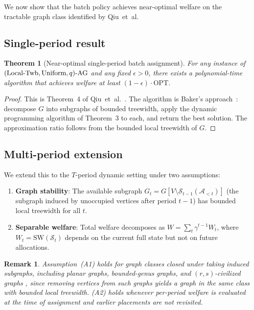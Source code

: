 \documentclass[11pt]{article}
\newtheorem{theorem}{Theorem}
\newtheorem{remark}{Remark}
\newcommand{\SW}{\mathrm{SW}}
\newcommand{\OPT}{\mathrm{OPT}}
\newcommand{\A}{\mathcal{A}}
\begin{document}
We now show that the batch policy achieves near-optimal welfare on the tractable graph
class identified by Qiu~et~al.

\subsection{Single-period result}

\begin{theorem}[Near-optimal single-period batch assignment]
  \label{thm:ptas-single}
  For any instance of $(\textup{Local-Twb}, \textup{Uniform}, q)\text{-}\mathrm{AG}$
  and any fixed $\epsilon > 0$, there exists a polynomial-time algorithm that
  achieves welfare at least $(1 - \epsilon) \cdot \OPT$.
\end{theorem}

\begin{proof}
  This is Theorem~4 of Qiu~et~al.~\cite{qiu2025welfare}.
  The algorithm is Baker's approach~\cite{baker1994}: decompose $G$ into subgraphs of
  bounded treewidth, apply the dynamic programming algorithm of Theorem~3 to each,
  and return the best solution.
  The approximation ratio follows from the bounded local treewidth of $G$.
\end{proof}

\subsection{Multi-period extension}

We extend this to the $T$-period dynamic setting under two assumptions:

\begin{enumerate}[label=(A\arabic*)]
  \item \textbf{Graph stability}: The available subgraph $G_t = G[V \setminus \mathcal{S}_{t-1}(\A_{<t})]$
    (the subgraph induced by unoccupied vertices after period $t-1$) has bounded local
    treewidth for all $t$.
  \item \textbf{Separable welfare}: Total welfare decomposes as
    $W = \sum_t \gamma^{t-1} W_t$, where $W_t = \SW(\mathcal{S}_t)$ depends on the
    current full state but not on future allocations.
\end{enumerate}

\begin{remark}
  Assumption~(A1) holds for graph classes closed under taking induced subgraphs,
  including planar graphs, bounded-genus graphs, and $(r,s)$-civilized graphs
  \cite{hunt1998}, since removing vertices from such graphs yields a graph in
  the same class with bounded local treewidth.
  (A2) holds whenever per-period welfare is evaluated at the time of assignment
  and earlier placements are not revisited.
\end{remark}
\end{document}
